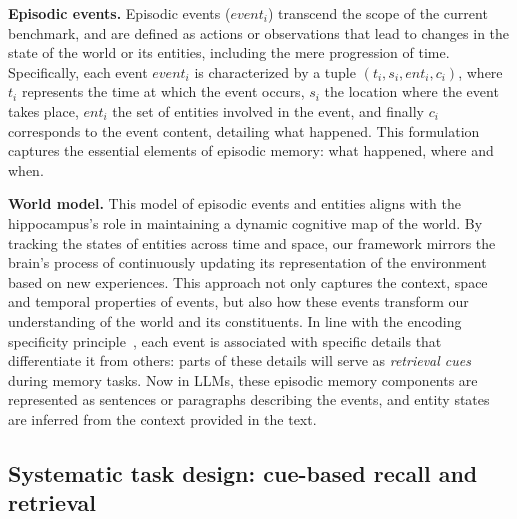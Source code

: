 \documentclass{article}
\begin{document}
\noindent \textbf{Episodic events.}
Episodic events ($event_i$) transcend the scope of the current benchmark, and are defined as actions or observations that lead to changes in the state of the world or its entities, including the mere progression of time. Specifically, each event \( event_i \) is characterized by a tuple \((t_i, s_i, ent_i, c_i)\), where 
\( t_i \) represents the time at which the event occurs,
\( s_i \) the location where the event takes place,
\( ent_i \) the set of entities involved in the event,
and finally \( c_i \) corresponds to the event content, detailing what happened. This formulation captures the essential elements of episodic memory: what happened, where and when.

\noindent \textbf{World model.} This model of episodic events and entities aligns with the hippocampus's role in maintaining a dynamic cognitive map of the world. By tracking the states of entities across time and space, our framework mirrors the brain's process of continuously updating its representation of the environment based on new experiences. This approach not only captures the context, space and temporal properties of events, but also how these events transform our understanding of the world and its constituents. In line with the encoding specificity principle~\citep{Tulving1973}, each event is associated with specific details that differentiate it from others: parts of these details will serve as \textit{retrieval cues} during memory tasks. Now in LLMs, these episodic memory components are represented as sentences or paragraphs describing the events, and entity states are inferred from the context provided in the text.

\subsection{Systematic task design: cue-based recall and retrieval}
\end{document}
